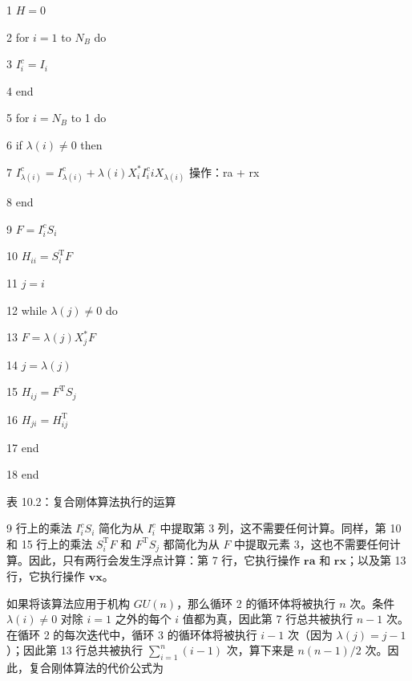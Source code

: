 \documentclass[10pt,a4paper]{book}
\theoremstyle{thmstyle} %
\theoremstyle{defstyle} %
\theoremstyle{prostyle} %
\begin{document}
1 $H=0$



2 for $i=1$ to $N_{B}$ do



3 $I_{i}^{c}=I_{i}$



4 end



5 for $i=N_{B}$ to 1 do



6 if $\lambda(i)\neq0$ then



7 $I_{\lambda(i)}^{c}=I_{\lambda(i)}^{c}+\lambda(i)X_{i}^{*}I_{i}^{c}iX_{\lambda(i)}$ 操作：ra + rx



8 end



9 $F=I_{i}^{c}S_{i}$



10 $H_{ii}=S_{i}^{\mathrm{T}}F$



11 $j=i$



12 while $\lambda(j)\neq0$ do



13 $F=\lambda(j)X_{j}^{*}F$



14 $j=\lambda(j)$



15 $H_{ij}=F^{\mathrm{T}}S_{j}$



16 $H_{ji}=H_{ij}^{\mathrm{T}}$



17 end



18 end



表 10.2：复合刚体算法执行的运算



9 行上的乘法 $I_{i}^{c}S_{i}$ 简化为从 $I_{i}^{c}$ 中提取第 3 列，这不需要任何计算。同样，第 10 和 15 行上的乘法 $S_{i}^{\mathrm{T}}F$ 和 $F^{\mathrm{T}}S_{j}$ 都简化为从 $F$ 中提取元素 3，这也不需要任何计算。因此，只有两行会发生浮点计算：第 7 行，它执行操作 $\mathbf{ra}$ 和 $\mathbf{rx}$；以及第 13 行，它执行操作 $\mathbf{v}\mathbf{x}$。



如果将该算法应用于机构 $GU(n)$，那么循环 2 的循环体将被执行 $n$ 次。条件 $\lambda(i) \neq 0$ 对除 $i=1$ 之外的每个 $i$ 值都为真，因此第 7 行总共被执行 $n-1$ 次。在循环 2 的每次迭代中，循环 3 的循环体将被执行 $i-1$ 次（因为 $\lambda(j) = j-1$）；因此第 13 行总共被执行 $\sum_{i=1}^{n}(i-1)$ 次，算下来是 $n(n-1)/2$ 次。因此，复合刚体算法的代价公式为
\end{document}
